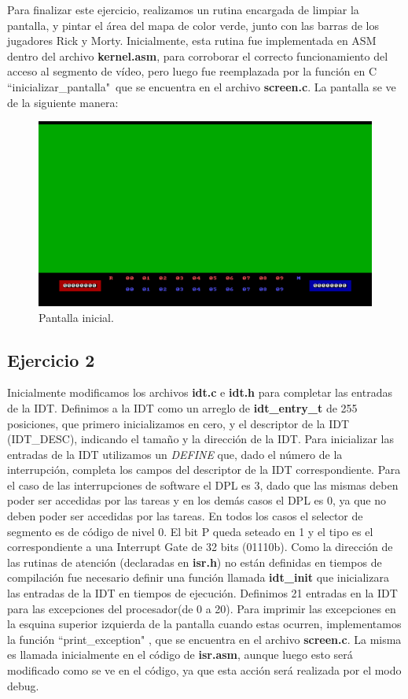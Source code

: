 \documentclass[a4paper]{article}
\begin{document}
\justify
Para finalizar este ejercicio, realizamos un rutina encargada de limpiar la pantalla, y pintar el área del mapa de color verde, junto con las barras de los jugadores Rick y Morty. Inicialmente, esta rutina fue implementada en ASM dentro del archivo \textbf{kernel.asm}, para corroborar el correcto funcionamiento del acceso al segmento de vídeo, pero luego fue reemplazada por la función en C ``inicializar_pantalla"\ que se encuentra en el archivo \textbf{screen.c}. La pantalla se ve de la siguiente manera:

\begin{figure}[h]
	\centering
	\includegraphics[scale=0.6]{img/Pantalla.pdf}
	\caption{Pantalla inicial.}
\end{figure}


\subsection{Ejercicio 2}
\justify
Inicialmente modificamos los archivos \textbf{idt.c} e \textbf{idt.h} para completar las entradas de la IDT. Definimos a la IDT como un arreglo de \textbf{idt_entry_t} de 255 posiciones, que primero inicializamos en cero, y el descriptor de la IDT (IDT_DESC), indicando el tamaño y la dirección de la IDT. Para inicializar las entradas de la IDT utilizamos un \textit{DEFINE} que, dado el número de la interrupción, completa los campos del descriptor de la IDT correspondiente. Para el caso de las interrupciones de software el DPL es 3, dado que las mismas deben poder ser accedidas por las tareas y en los demás casos el DPL es 0, ya que no deben poder ser accedidas por las tareas. En todos los casos el selector de segmento es de código de nivel 0. El bit P queda seteado en 1 y el tipo es el correspondiente a una Interrupt Gate de 32 bits (01110b). Como la dirección de las rutinas de atención (declaradas en \textbf{isr.h}) no están definidas en tiempos de compilación fue necesario definir una función llamada \textbf{idt_init} que inicializara las entradas de la IDT en tiempos de ejecución. Definimos 21 entradas en la IDT para las excepciones del procesador(de 0 a 20).
\justify
Para imprimir las excepciones en la esquina superior izquierda de la pantalla  cuando estas ocurren, implementamos la función ``print_exception" , que se encuentra en el archivo \textbf{screen.c}. La misma es llamada inicialmente en el código de \textbf{isr.asm}, aunque luego esto será modificado como se ve en el código, ya que esta acción será realizada por el modo debug. 
\end{document}
